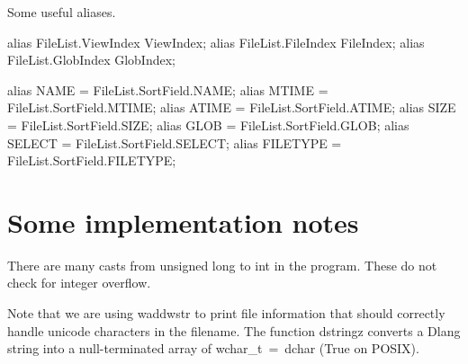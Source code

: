 \nwendcode{}Some useful aliases.

\nwenddocs{}\endmoddef\nwstartdeflinemarkup\nwenddeflinemarkup
alias FileList.ViewIndex ViewIndex;
alias FileList.FileIndex FileIndex;
alias FileList.GlobIndex GlobIndex;

alias NAME     = FileList.SortField.NAME;
alias MTIME    = FileList.SortField.MTIME;
alias ATIME    = FileList.SortField.ATIME;
alias SIZE     = FileList.SortField.SIZE;
alias GLOB     = FileList.SortField.GLOB;
alias SELECT   = FileList.SortField.SELECT;
alias FILETYPE = FileList.SortField.FILETYPE;

\nwendcode{}\section*{Some implementation notes} There are many casts from
unsigned long to int in the program. These do not check for integer
overflow.

Note that we are using {\Tt{}waddwstr\nwendquote} to print file information that
should correctly handle unicode characters in the filename. The
function {\Tt{}dstringz\nwendquote} converts a Dlang {\Tt{}string\nwendquote} into a
null-terminated array of {\Tt{}wchar{\_}t\ =\ dchar\nwendquote} (True on POSIX).

\nwenddocs{}
